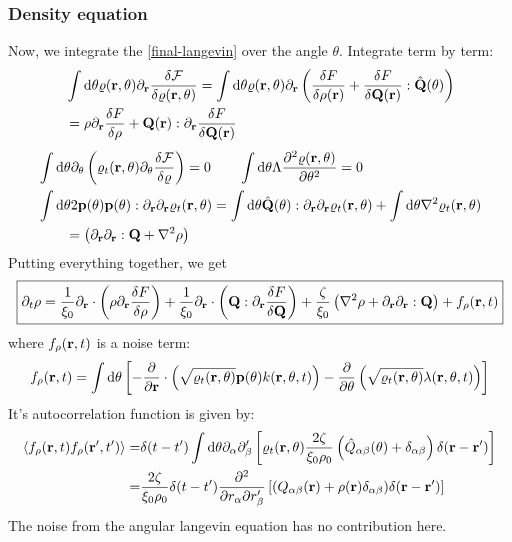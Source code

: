 \documentclass[a5paper]{article}
\begin{document}
\subsubsection{Density equation}
Now, we integrate the \cref{final-langevin} over the angle $\theta$. Integrate term by term:
\begin{align}
&\int \mathrm{d}\theta
    \varrho(\mathbf{r}, \theta)\partial_{\mathbf{r}} \frac{\delta \mathcal{F}}{\delta \varrho(\mathbf{r}, \theta)}
    =
        \int \mathrm{d}\theta \varrho(\mathbf{r}, \theta)\partial_{\mathbf{r}} \left(\frac{\delta F}{\delta \rho(\mathbf{r})} 
        + \frac{\delta F}{\delta \mathbf{Q}(\mathbf{r})} : \hat{\mathbf{Q}}(\theta) 
        \right)
    \\
    &=\rho \partial_{\mathbf{r}} \frac{\delta F}{\delta \rho}
    +\mathbf{Q}(\mathbf{r}):\partial_{\mathbf{r}}\frac{\delta F}{\delta \mathbf{Q}(\mathbf{r})} 
\end{align}
\begin{align}
    &\int \mathrm{d}\theta \partial_\theta\left(\varrho_t(\mathbf{r}, \theta)\partial_\theta\frac{\delta\mathcal{F}}{\delta\varrho}\right) = 0
    \qquad
    \int \mathrm{d}\theta\Lambda \frac{\partial^2 \varrho(\mathbf{r}, \theta)}{\partial \theta^2} = 0
    \\
    &\int \mathrm{d}\theta 2 \mathbf{p}(\theta) \mathbf{p}(\theta) :\partial_{\mathbf{r}}\partial_{\mathbf{r}} \varrho_t(\mathbf{r}, \theta) 
    = \int \mathrm{d}\theta \hat{\mathbf{Q}}(\theta):\partial_{\mathbf{r}}\partial_{\mathbf{r}} \varrho_t(\mathbf{r}, \theta) + \int \mathrm{d}\theta \nabla^2 \varrho_t(\mathbf{r}, \theta)
    \\
    &\qquad=\left(\partial_{\mathbf{r}}\partial_{\mathbf{r}} : \mathbf{Q} + \nabla^2 \rho\right)
\end{align}
Putting everything together, we get
\begin{align}
    \label{rho-equation}
    \boxed{
    \partial_t \rho = \frac{1}{\xi_0}\partial_{\mathbf{r}} \cdot\left(
    \rho \partial_{\mathbf{r}} \frac{\delta F}{\delta \rho}\right)
    + \frac{1}{\xi_0} \partial_{\mathbf{r}} \cdot\left( \mathbf{Q}:\partial_{\mathbf{r}} \frac{\delta F}{\delta \mathbf{Q}}\right)
    + \frac{\zeta}{\xi_0} \left(\nabla^2 \rho + \partial_{\mathbf{r}}\partial_{\mathbf{r}} : \mathbf{Q}\right)
    + 
    f_\rho(\mathbf{r}, t)
    }
\end{align}
where $f_\rho(\mathbf{r}, t)$ is a noise term:
\begin{align}
    f_\rho(\mathbf{r}, t) = \int \mathrm{d}\theta \left[-
    \frac{\partial }{\partial \mathbf{r}}\cdot\left(\sqrt{\varrho_t(\mathbf{r}, \theta)} \mathbf{p}(\theta) k(\mathbf{r}, \theta, t)\right)
    - \frac{\partial }{\partial \theta}\left(\sqrt{\varrho_t(\mathbf{r}, \theta)} \lambda(\mathbf{r}, \theta, t)\right)
    \right]
\end{align}
It's autocorrelation function is given by:
\begin{align}
    \label{rho-noise-autocorrelation}
    \left\langle f_\rho(\mathbf{r}, t) f_\rho(\mathbf{r}', t') \right\rangle =& \delta(t-t')
    \int \mathrm{d}\theta 
    \partial_\alpha\partial'_\beta\left[
    \varrho_t(\mathbf{r}, \theta) \frac{2\zeta}{\xi_0\rho_0} \left(\hat Q_{\alpha\beta}(\theta)+\delta_{\alpha\beta}\right)\delta(\mathbf{r}-\mathbf{r}')\right]
    \\
    =&\frac{2\zeta}{\xi_0\rho_0} \delta(t-t') 
    \frac{\partial^2}{\partial r_\alpha \partial r'_\beta}\left[(Q_{\alpha\beta}(\mathbf{r})+\rho(\mathbf{r}) \delta_{\alpha\beta})
   \delta(\mathbf{r}-\mathbf{r}')\right]
\end{align}
The noise from the angular langevin equation has no contribution here.
 
\end{document}
